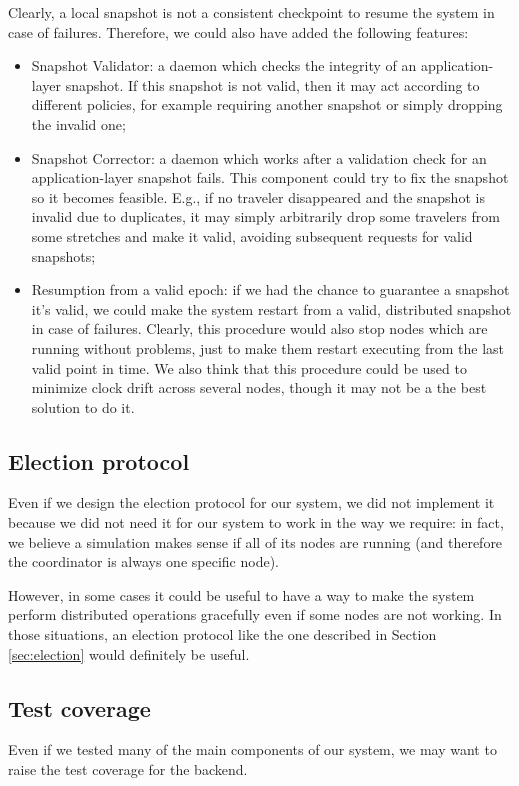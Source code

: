 Clearly, a local snapshot is not a consistent checkpoint to resume the system
in case of failures. Therefore, we could also have added the following
features:

\begin{itemize}
  \item Snapshot Validator: a daemon which checks the integrity of an
        application-layer snapshot. If this snapshot is not valid, then it may
        act according to different policies, for example requiring another
        snapshot or simply dropping the invalid one;
  \item Snapshot Corrector: a daemon which works after a validation check for
        an application-layer snapshot fails. This component could try to fix
        the snapshot so it becomes feasible. E.g., if no traveler disappeared
        and the snapshot is invalid due to duplicates, it may simply
        arbitrarily drop some travelers from some stretches and make it valid,
        avoiding subsequent requests for valid snapshots;
  \item Resumption from a valid epoch: if we had the chance to guarantee a
        snapshot it's valid, we could make the system restart from a valid,
        distributed snapshot in case of failures. Clearly, this procedure would
        also stop nodes which are running without problems, just to make them
        restart executing from the last valid point in time.
        We also think that this procedure could be used to minimize clock
        drift across several nodes, though it may not be a the best solution
        to do it.
\end{itemize}

\subsection{Election protocol}
Even if we design the election protocol for our system, we did not implement it
because we did not need it for our system to work in the way we require: in
fact, we believe a simulation makes sense if all of its nodes are running (and
therefore the coordinator is always one specific node).

However, in some cases it could be useful to have a way to make the system
perform distributed operations gracefully even if some nodes are not working.
In those situations, an election protocol like the one described in Section
\ref{sec:election} would definitely be useful.

\subsection{Test coverage}
Even if we tested many of the main components of our system, we may want to
raise the test coverage for the backend.

